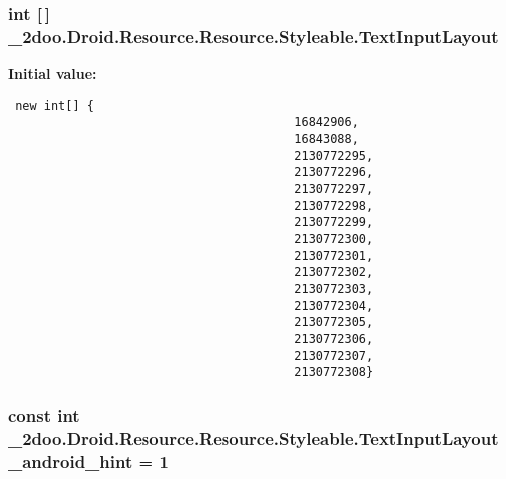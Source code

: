 \hypertarget{class__2doo_1_1_droid_1_1_resource_1_1_styleable_fd09dc80206f1b00ce4229d673046239}{
\subsubsection[{TextInputLayout}]{\setlength{\rightskip}{0pt plus 5cm}int \mbox{[}$\,$\mbox{]} \_\-2doo.Droid.Resource.Resource.Styleable.TextInputLayout}}
\label{class__2doo_1_1_droid_1_1_resource_1_1_styleable_fd09dc80206f1b00ce4229d673046239}


\textbf{Initial value:}

\begin{Code}\begin{verbatim} new int[] {
                                        16842906,
                                        16843088,
                                        2130772295,
                                        2130772296,
                                        2130772297,
                                        2130772298,
                                        2130772299,
                                        2130772300,
                                        2130772301,
                                        2130772302,
                                        2130772303,
                                        2130772304,
                                        2130772305,
                                        2130772306,
                                        2130772307,
                                        2130772308}
\end{verbatim}
\end{Code}
\hypertarget{class__2doo_1_1_droid_1_1_resource_1_1_styleable_d8a00dba70074cdd1ceb08cf690cd147}{
\subsubsection[{TextInputLayout\_\-android\_\-hint}]{\setlength{\rightskip}{0pt plus 5cm}const int \_\-2doo.Droid.Resource.Resource.Styleable.TextInputLayout\_\-android\_\-hint = 1}}
\label{class__2doo_1_1_droid_1_1_resource_1_1_styleable_d8a00dba70074cdd1ceb08cf690cd147}


